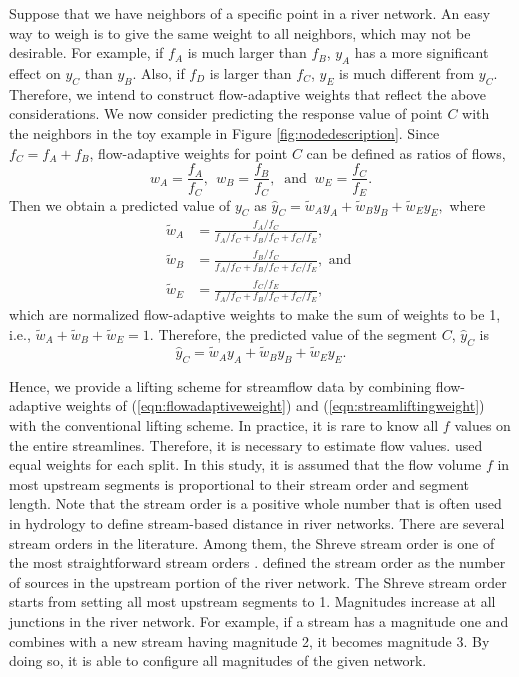 \documentclass[11pt,titlepage]{article}
\begin{document}
Suppose that we have neighbors of a specific point in a river network. An easy way to weigh is to give the same weight to all neighbors, which may not be desirable. For example, if $f_A$ is much larger than $f_B$, $y_A$ has a more significant effect on $y_C$ than $y_B$. Also, if $f_D$ is larger than $f_C$, $y_E$ is much different from $y_C$. Therefore, we intend to construct flow-adaptive weights that reflect the above considerations. We now consider predicting the response value of point $C$ with the neighbors in the toy example in Figure \ref{fig:nodedescription}. Since $f_{C}= f_{A}+ f_{B}$, flow-adaptive weights for point $C$ can be defined as ratios of flows, 
\begin{equation}
w_{A} = \frac{f_{A}}{f_{C}},~~w_{B}=\frac{f_{B}}{f_{C}}, ~\text{ and }~ w_{E}=\frac{f_{C}}{f_{E}}.
\label{eqn:flowadaptiveweight}
\end{equation}
Then we obtain a predicted value of $y_{C}$ as $\hat{y}_{C} = \tilde{w}_{A}y_{A} + \tilde{w}_{B}y_{B} + \tilde{w}_{E}y_{E},$  where
\begin{align}
\tilde{w}_{A} &= \frac{f_{A}/f_{C}}{f_{A}/f_{C} + f_{B}/f_{C} + f_{C}/f_{E}},\nonumber\\
\tilde{w}_{B} &= \frac{f_{B}/f_{C}}{f_{A}/f_{C} + f_{B}/f_{C} + f_{C}/f_{E}}, \text{ and } \label{eqn:streamliftingweight}\\
\tilde{w}_{E} &= \frac{f_{C}/f_{E}}{f_{A}/f_{C} + f_{B}/f_{C} + f_{C}/f_{E}},\nonumber
\end{align}
which are normalized flow-adaptive weights to make the sum of weights to be 1, i.e., $\tilde{w}_A + \tilde{w}_B + \tilde{w}_E = 1$. Therefore, the predicted value of the segment $C$, $\hat{y}_{C}$ is
\[
\hat{y}_{C}  = \tilde{w}_{A}y_{A} + \tilde{w}_{B}y_{B} + \tilde{w}_{E}y_{E}.
\]

Hence, we provide a lifting scheme for streamflow data by combining flow-adaptive weights of (\ref{eqn:flowadaptiveweight}) and (\ref{eqn:streamliftingweight}) with the conventional lifting scheme. In practice, it is rare to know all $f$ values on the entire streamlines. Therefore, it is necessary to estimate flow values. \cite{VerHoef(2006)} used equal weights for each split. In this study, it is assumed that the flow volume $f$ in most upstream segments is proportional to their stream order and segment length. Note that the stream order is a positive whole number that is often used in hydrology to define stream-based distance in river networks. There are several stream orders in the literature. Among them, the Shreve stream order is one of the most straightforward stream orders \citep{Cressie2006, VerHoef(2010)}. \cite{Cressie2006} defined the stream order as the number of sources in the upstream portion of the river network. The Shreve stream order starts from setting all most upstream segments to 1. Magnitudes increase at all junctions in the river network. For example, if a stream has a magnitude one and combines with a new stream having magnitude 2, it becomes magnitude 3. By doing so, it is able to configure all magnitudes of the given network.
\end{document}
